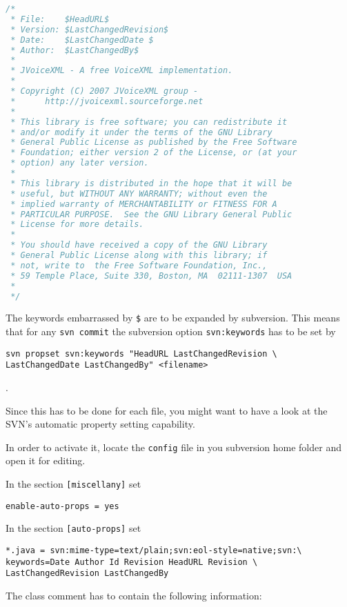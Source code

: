 \documentclass[11pt,a4paper]{article}
\begin{document}
\begin{lstlisting}[language=Java]
/*
 * File:    $HeadURL$
 * Version: $LastChangedRevision$
 * Date:    $LastChangedDate $
 * Author:  $LastChangedBy$
 *
 * JVoiceXML - A free VoiceXML implementation.
 *
 * Copyright (C) 2007 JVoiceXML group - 
 *      http://jvoicexml.sourceforge.net
 *
 * This library is free software; you can redistribute it 
 * and/or modify it under the terms of the GNU Library 
 * General Public License as published by the Free Software 
 * Foundation; either version 2 of the License, or (at your 
 * option) any later version.
 *
 * This library is distributed in the hope that it will be 
 * useful, but WITHOUT ANY WARRANTY; without even the 
 * implied warranty of MERCHANTABILITY or FITNESS FOR A 
 * PARTICULAR PURPOSE.  See the GNU Library General Public 
 * License for more details.
 *
 * You should have received a copy of the GNU Library 
 * General Public License along with this library; if 
 * not, write to  the Free Software Foundation, Inc., 
 * 59 Temple Place, Suite 330, Boston, MA  02111-1307  USA
 *
 */
\end{lstlisting}

The keywords embarrassed by \texttt{\$} are to be expanded by 
subversion. 
This means that for any \texttt{svn commit} the subversion
option \texttt{svn:keywords} has to be set by

\begin{lstlisting}
svn propset svn:keywords "HeadURL LastChangedRevision \
LastChangedDate LastChangedBy" <filename>
\end{lstlisting}.

Since this has to be done for each file, you might want to have a look
at the SVN's automatic property setting capability.

In order to activate it, locate the \texttt{config} file in you subversion home
folder and open it for editing.

In the section \texttt{[miscellany]} set
\begin{lstlisting}
enable-auto-props = yes
\end{lstlisting}

In the section \texttt{[auto-props]} set
\begin{lstlisting}
*.java = svn:mime-type=text/plain;svn:eol-style=native;svn:\
keywords=Date Author Id Revision HeadURL Revision \
LastChangedRevision LastChangedBy
\end{lstlisting}

The class comment has to contain the following information:
\end{document}
